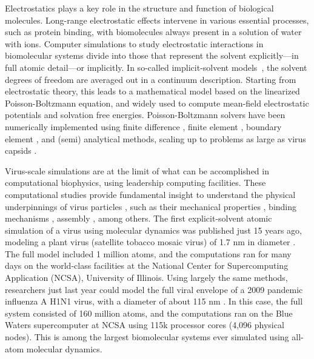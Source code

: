 Electrostatics plays a key role in the structure and function of biological molecules.
Long-range electrostatic effects intervene in various essential processes, such as protein binding, with biomolecules always present in a solution of water with ions.
Computer simulations to study electrostatic interactions in biomolecular systems divide into those that represent the solvent explicitly---in full atomic detail---or implicitly.
In so-called implicit-solvent models~\cite{RouxSimonson1999,DecherchiETal2015}, the solvent degrees of freedom are averaged out in a continuum description.
Starting from electrostatic theory, this leads to a mathematical model based on the linearized Poisson-Boltzmann equation, and widely used to compute mean-field electrostatic potentials and solvation free energies.
Poisson-Boltzmann solvers have been numerically implemented using finite difference \cite{RocchiaAlexovHonig2001, BakerETal2001, chen2011mibpb}, finite element \cite{BakerETal2001,BondETal2010,HolstETal2012}, boundary element \cite{AltmanBardhanWhiteTidor2009, GengKrasny2013, ZhangPengHuangPitsianisSunLu2015, CooperBardhanBarba2014}, and (semi) analytical \cite{LotanHead-Gordon2006,FelbergETal2017} methods, scaling up to problems as large as virus capsids \cite{ZhangETal2019,MartinezETal2019}.

Virus-scale simulations are at the limit of what can be accomplished in computational biophysics, using leadership computing facilities.
These computational studies provide fundamental insight to understand the physical underpinnings of virus particles \cite{HaddenPerilla2018}, such as their mechanical properties \cite{ArkhipovETal2009}, binding mechanisms \cite{DurrantETal2020}, assembly \cite{DickETal2018}, among others. 
The first explicit-solvent atomic simulation of a virus using molecular dynamics was published just 15 years ago, modeling a plant virus (satellite tobacco mosaic virus) of 1.7 nm in diameter \cite{FreddolinoETal2006}.
The full model included 1 million atoms, and the computations ran for many days on the world-class facilities at the National Center for Supercomputing Application (NCSA), University of Illinois.
Using largely the same methods, researchers just last year could model the full viral envelope of a 2009 pandemic influenza A H1N1 virus, with a diameter of about 115 nm \cite{DurrantETal2020}.
In this case, the full system consisted of 160 million atoms, and the computations ran on the Blue Waters supercomputer at NCSA using 115k processor cores (4,096 physical nodes).
This is among the largest biomolecular systems ever simulated using all-atom molecular dynamics.

